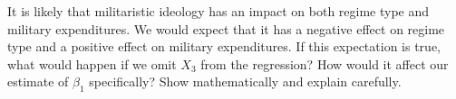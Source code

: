 \documentclass[12pt]{article}
\begin{document}
\bigskip

It is likely that militaristic ideology has an impact on both regime type and military expenditures. We would expect that it has a negative effect on regime type and a positive effect on military expenditures. If this expectation is true, what would happen if we omit $X_3$ from the regression? How would it affect our estimate of $\beta_1$ specifically? Show mathematically and explain carefully.
\end{document}
